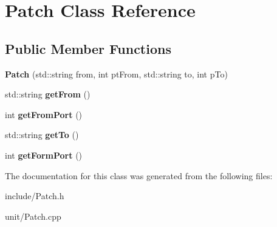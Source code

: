 \hypertarget{classPatch}{}\section{Patch Class Reference}
\label{classPatch}
\subsection*{Public Member Functions}
\begin{DoxyCompactItemize}
\item 
{\bfseries Patch} (std\+::string from, int pt\+From, std\+::string to, int p\+To)\hypertarget{classPatch_a5ff9de0f83c44aa11aae837870aa55f0}{}\label{classPatch_a5ff9de0f83c44aa11aae837870aa55f0}

\item 
std\+::string {\bfseries get\+From} ()\hypertarget{classPatch_a97b08ef9e08c5ef8b5d71692a7242796}{}\label{classPatch_a97b08ef9e08c5ef8b5d71692a7242796}

\item 
int {\bfseries get\+From\+Port} ()\hypertarget{classPatch_a365988c401459bfd0f0b5b21f041bfe1}{}\label{classPatch_a365988c401459bfd0f0b5b21f041bfe1}

\item 
std\+::string {\bfseries get\+To} ()\hypertarget{classPatch_ade1fb3107faa8224f29c4a8387821fee}{}\label{classPatch_ade1fb3107faa8224f29c4a8387821fee}

\item 
int {\bfseries get\+Form\+Port} ()\hypertarget{classPatch_a19e489d67f86b80ac5f0ef774a3b87c8}{}\label{classPatch_a19e489d67f86b80ac5f0ef774a3b87c8}

\end{DoxyCompactItemize}


The documentation for this class was generated from the following files\+:\begin{DoxyCompactItemize}
\item 
include/Patch.\+h\item 
unit/Patch.\+cpp\end{DoxyCompactItemize}
